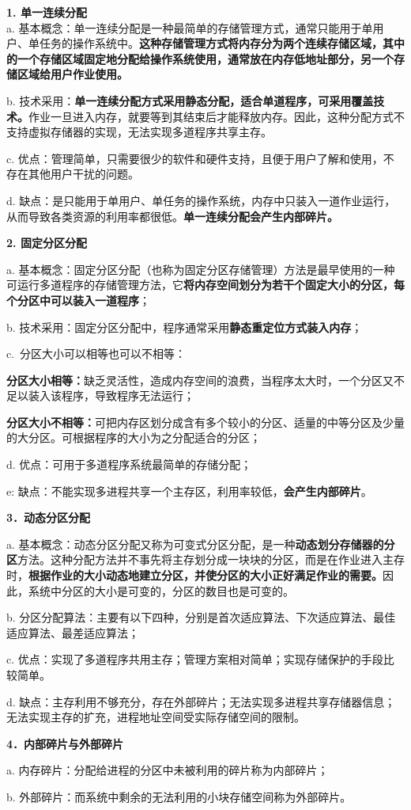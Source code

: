 \textbf{{1. 单一连续分配}}\\

a.
基本概念：单一连续分配是一种最简单的存储管理方式，通常只能用于单用户、单任务的操作系统中。\textbf{这种存储管理方式将内存分为两个连续存储区域，其中的一个存储区域固定地分配给操作系统使用，通常放在内存低地址部分，另一个存储区域给用户作业使用。}

b.
技术采用：\textbf{单一连续分配方式采用静态分配，适合单道程序，可采用覆盖技术。}{作业一旦进入内存，就要等到其结束后才能释放内存。因此，这种分配方式不支持虚拟存储器的实现，无法实现多道程序共享主存。}

{c.
优点：}{管理简单，只需要很少的软件和硬件支持，且便于用户了解和使用，不存在其他用户干扰的问题。}

d.
缺点：是只能用于单用户、单任务的操作系统，内存中只装入一道作业运行，从而导致各类资源的利用率都很低。{\textbf{单一连续分配会产生内部碎片。}}

\textbf{{2. 固定分区分配}}

a.
基本概念：固定分区分配（也称为固定分区存储管理）方法是最早使用的一种可运行多道程序的存储管理方法，它\textbf{将内存空间划分为若干个固定大小的分区，每个分区中可以装入一道程序}；

b.
技术采用：固定分区分配中，程序通常采用\textbf{静态重定位方式装入内存}；

c.~分区大小可以相等也可以不相等：

\textbf{分区大小相等：}缺乏灵活性，造成内存空间的浪费，当程序太大时，一个分区又不足以装入该程序，导致程序无法运行；

\textbf{分区大小不相等：}可把内存区划分成含有多个较小的分区、适量的中等分区及少量的大分区。可根据程序的大小为之分配适合的分区；

d. 优点：可用于多道程序系统最简单的存储分配；

e:
缺点：不能实现多进程共享一个主存区，利用率较低，{\textbf{会产生内部碎片}}。

\textbf{{3．动态分区分配}}

a.
基本概念：动态分区分配又称为可变式分区分配，是一种\textbf{动态划分存储器的分区}方法。这种分配方法并不事先将主存划分成一块块的分区，而是在作业进入主存时，\textbf{根据作业的大小动态地建立分区，并使分区的大小正好满足作业的需要。}因此，系统中分区的大小是可变的，分区的数目也是可变的。

b.
分区分配算法：主要有以下四种，分别是首次适应算法、下次适应算法、最佳适应算法、最差适应算法；

c.
优点：{实现了多道程序共用主存；管理方案相对简单；实现存储保护的手段比较简单。}

d.
缺点：主存利用不够充分，存在外部碎片；无法实现多进程共享存储器信息；无法实现主存的扩充，进程地址空间受实际存储空间的限制。

\textbf{{4．内部碎片与外部碎片}}

a. 内存碎片：{分配给进程的分区中未被利用的碎片称为内部碎片；}

b. 外部碎片：而系统中剩余的无法利用的小块存储空间称为外部碎片。
